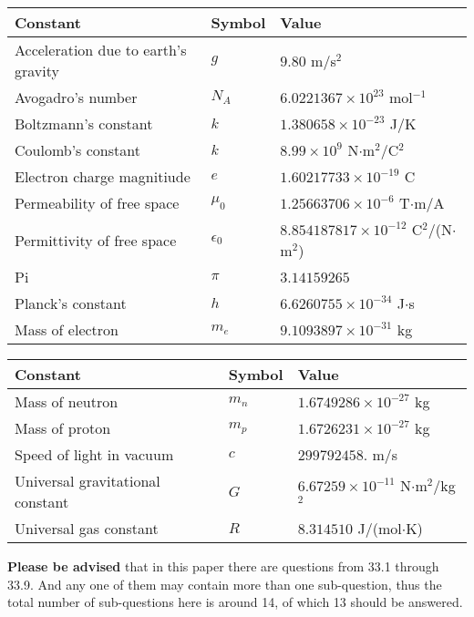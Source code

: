 \documentclass[12pt]{article}
\begin{document}
 
 
\noindent\begin{tabular}{|l|l|l|}
\hline
Constant & Symbol & Value \\
\hline
Acceleration due to earth's gravity &
$g$ &
 $ 9.80 $
m/s$^2$ \\
\hline
Avogadro's number &
$N_A$ &
 $ 6.0221367 \times 10^{23} $
mol$^{-1}$ \\
\hline
Boltzmann's constant &
$k$ &
 $ 1.380658 \times 10^{-23} $
J/K \\
\hline
Coulomb's constant &
$k$ &
 $ 8.99 \times 10^{9} $
N$\cdot $m$^2$/C$^2$ \\
\hline
Electron charge magnitiude &
$e$ &
 $ 1.60217733 \times 10^{-19} $
C \\
\hline
Permeability of free space &
$\mu _0$ &
 $ 1.25663706 \times 10^{-6} $
T$\cdot $m/A \\
\hline
Permittivity of free space &
$\epsilon _0$ &
 $ 8.854187817 \times 10^{-12} $
C$^2$/(N$\cdot $m$^2$) \\
\hline
Pi &
$\pi$ &
 $ 3.14159265 $
$ $ \\
\hline
Planck's constant &
$h$ &
 $ 6.6260755 \times 10^{-34} $
J$\cdot $s \\
\hline
Mass of electron &
$m_e$ &
 $ 9.1093897 \times 10^{-31} $
kg \\
\hline
\end{tabular}
 
 
\noindent\begin{tabular}{|l|l|l|}
\hline
Constant & Symbol & Value \\
\hline
Mass of neutron &
$m_n$ &
 $ 1.6749286 \times 10^{-27} $
kg \\
\hline
Mass of proton &
$m_p$ &
 $ 1.6726231 \times 10^{-27} $
kg \\
\hline
Speed of light in vacuum &
$c$ &
 $ 299792458. $
m/s \\
\hline
Universal gravitational constant &
$G$ &
 $ 6.67259 \times 10^{-11} $
N$\cdot $m$^2$/kg$^2$ \\
\hline
Universal gas constant &
$R$ &
 $ 8.314510 $
J/(mol$\cdot $K) \\
\hline
\end{tabular}
 
 
{\textbf{\large{Please be advised}}} that in this paper there are questions from
33.1 through
33.9.
And any one of them may contain more than one sub-question, thus the total number
of sub-questions here is around 14, of which
13 should be answered.
 
\end{document}
